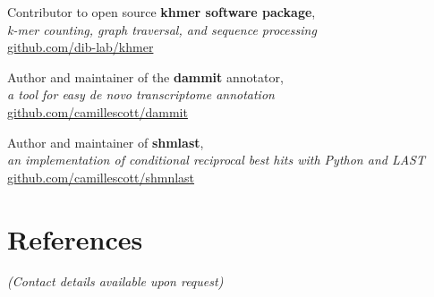 \documentclass[margin,12pt]{camille_resume}
\begin{document}
\begin{resume}
\begin{list1}
\item[] Contributor to open source {\bf khmer software package},\\ 
{\em k-mer counting, graph traversal, and sequence processing}\\
\hfill \href{https://github.com/ged-lab/khmer/}{github.com/dib-lab/khmer}\\

\item[] Author and maintainer of the {\bf dammit} annotator,\\
{\em a tool for easy de novo transcriptome annotation}\\
\hfill \href{https://github.com/camillescott/dammit}{github.com/camillescott/dammit}\\

\item[] Author and maintainer of {\bf shmlast},\\
{\em an implementation of conditional reciprocal best hits with Python and LAST}\\
\hfill \href{https://github.com/camillescott/shmlast}{github.com/camillescott/shmnlast}\\

\end{list1}


\section{\mysidestyle References}

{\em (Contact details available upon request)}

\end{resume}
\end{document}
